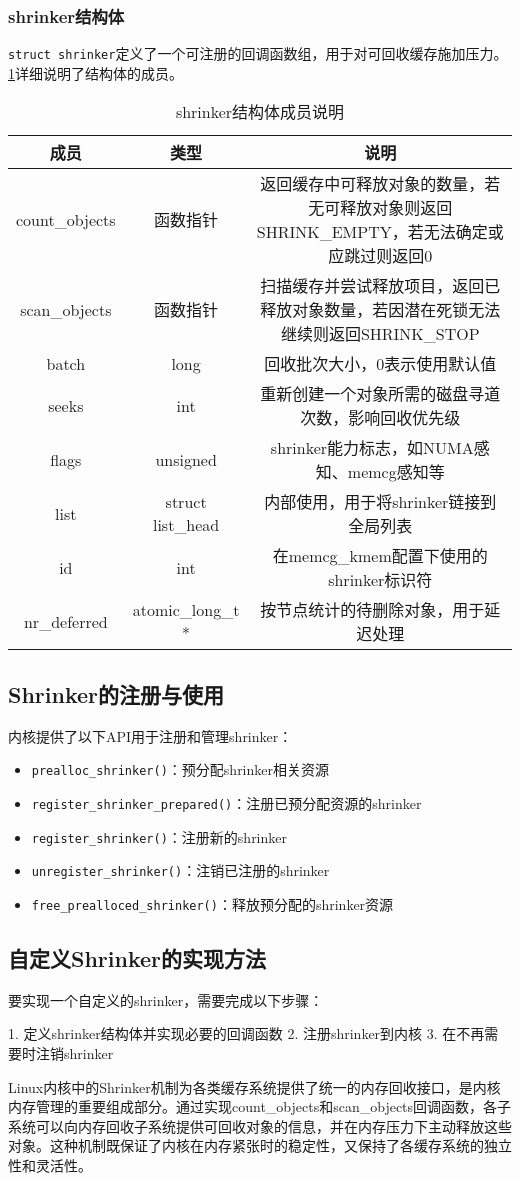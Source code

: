 \subsubsection{shrinker结构体}

\texttt{struct shrinker}定义了一个可注册的回调函数组，用于对可回收缓存施加压力。\ref{tab:shrinker_struct}详细说明了结构体的成员。

\begin{table}[htbp]
\label{tab:shrinker_struct}
\centering
\begin{tabular}{ccc}
\toprule
\textbf{成员} & \textbf{类型} & \textbf{说明} \\
\midrule
count\_objects & 函数指针 & 返回缓存中可释放对象的数量，若无可释放对象则返回SHRINK\_EMPTY，若无法确定或应跳过则返回0 \\
\midrule
scan\_objects & 函数指针 & 扫描缓存并尝试释放项目，返回已释放对象数量，若因潜在死锁无法继续则返回SHRINK\_STOP \\
\midrule
batch & long & 回收批次大小，0表示使用默认值 \\
\midrule
seeks & int & 重新创建一个对象所需的磁盘寻道次数，影响回收优先级 \\
\midrule
flags & unsigned & shrinker能力标志，如NUMA感知、memcg感知等 \\
\midrule
list & struct list\_head & 内部使用，用于将shrinker链接到全局列表 \\
\midrule
id & int & 在memcg\_kmem配置下使用的shrinker标识符 \\
\midrule
nr\_deferred & atomic\_long\_t * & 按节点统计的待删除对象，用于延迟处理 \\
\bottomrule
\end{tabular}
\caption{shrinker结构体成员说明}
\end{table}

\subsection{Shrinker的注册与使用}

内核提供了以下API用于注册和管理shrinker：

\begin{itemize}
    \item \texttt{prealloc\_shrinker()}：预分配shrinker相关资源
    \item \texttt{register\_shrinker\_prepared()}：注册已预分配资源的shrinker
    \item \texttt{register\_shrinker()}：注册新的shrinker
    \item \texttt{unregister\_shrinker()}：注销已注册的shrinker
    \item \texttt{free\_prealloced\_shrinker()}：释放预分配的shrinker资源
\end{itemize}

\subsection{自定义Shrinker的实现方法}

要实现一个自定义的shrinker，需要完成以下步骤：

1. 定义shrinker结构体并实现必要的回调函数
2. 注册shrinker到内核
3. 在不再需要时注销shrinker

Linux内核中的Shrinker机制为各类缓存系统提供了统一的内存回收接口，是内核内存管理的重要组成部分。通过实现count\_objects和scan\_objects回调函数，各子系统可以向内存回收子系统提供可回收对象的信息，并在内存压力下主动释放这些对象。这种机制既保证了内核在内存紧张时的稳定性，又保持了各缓存系统的独立性和灵活性。
